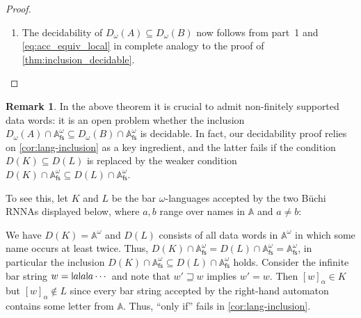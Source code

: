\documentclass[final,a4paper,UKenglish,thm-restate,autoref,numberwithinsect]{lipics-v2021}
\newcommand{\midmid}{\hspace{0.2ex}{\rule[-0.1ex]{0.6pt}{1.65ex}}\hspace{0.2ex}}
\newcommand{\newletter}[1]{{\midmid}#1}
\numberwithin{equation}{section}
\newcommand{\seq}{\subseteq}
\newcommand{\fs}{\mathsf{fs}}
\newcommand{\+}[1]{\mathcal{#1}\xspace}
\newcommand{\names}{\mathbb{A}}
\theoremstyle{definition}
\newtheorem{rem}[theorem]{Remark}
\begin{document}
\begin{proof}
\begin{enumerate}
  \item The decidability of $D_\omega(A)\seq D_\omega(B)$ now follows
    from part~1 and \eqref{eq:acc_equiv_local} in complete analogy to the proof
    of \autoref{thm:inclusion_decidable}.  \qedhere
  \end{enumerate}
\end{proof}
%
\begin{rem}\label{rem:data-language-finite-support}
  In the above theorem it is crucial to admit non-finitely supported
  data words: it is an open problem whether the inclusion
  $D_\omega(A)\cap \names^\omega_\fs\seq D_\omega(B)\cap
  \names^\omega_\fs$ is decidable. In fact, our decidability proof
  relies on \autoref{cor:lang-inclusion} as a key ingredient, and the
  latter fails if the condition $D(K)\seq D(L)$ is replaced by the
  weaker condition
  $D(K)\cap \names^\omega_\fs \seq D(L)\cap \names^\omega_\fs$.

  To see this, let $K$ and $L$ be the bar $\omega$-languages accepted
  by the two Büchi RNNAs displayed below, where $a,b$ range over names
  in $\names$ and $a\neq b$:
  \begin{center}
    \qquad\qquad\qquad
  \end{center}
  We have $D(K)=\names^\omega$ and $D(L)$ consists of all data words
  in $\names^\omega$ in which some name occurs at least twice. Thus,
  $D(K)\cap \names^\omega_\fs = D(L)\cap \names^\omega_\fs =
  \names^\omega_\fs$, in particular the inclusion
  $D(K)\cap \names^\omega_\fs \seq D(L)\cap \names^\omega_\fs$
  holds. Consider the infinite bar string
  $w=\newletter a\newletter a\newletter a\cdots$ and note that
  $w'\sqsupseteq w$ implies $w'=w$. Then $[w]_\alpha \in K$ but
  $[w]_\alpha\not\in L$ since every bar string accepted by the
  right-hand automaton contains some letter from $\names$. 
  Thus, ``only if'' fails in \autoref{cor:lang-inclusion}.
\end{rem}
%
\end{document}
